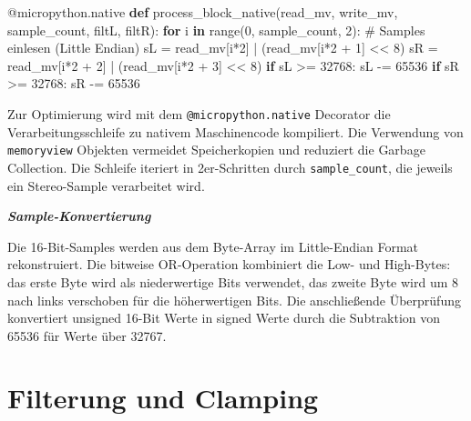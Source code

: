 \documentclass[
  ngerman,
  letterpaper,
  DIV=11]{scrreprt}
\newenvironment{Shaded}{\begin{snugshade}}{\end{snugshade}}
\newcommand{\AttributeTok}[1]{\textcolor[rgb]{0.40,0.45,0.13}{#1}}
\newcommand{\BuiltInTok}[1]{\textcolor[rgb]{0.00,0.23,0.31}{#1}}
\newcommand{\CommentTok}[1]{\textcolor[rgb]{0.37,0.37,0.37}{#1}}
\newcommand{\ControlFlowTok}[1]{\textcolor[rgb]{0.00,0.23,0.31}{\textbf{#1}}}
\newcommand{\DecValTok}[1]{\textcolor[rgb]{0.68,0.00,0.00}{#1}}
\newcommand{\KeywordTok}[1]{\textcolor[rgb]{0.00,0.23,0.31}{\textbf{#1}}}
\newcommand{\NormalTok}[1]{\textcolor[rgb]{0.00,0.23,0.31}{#1}}
\newcommand{\OperatorTok}[1]{\textcolor[rgb]{0.37,0.37,0.37}{#1}}
\begin{document}
\begin{Shaded}
\begin{Highlighting}[]
\AttributeTok{@micropython.native}
\KeywordTok{def}\NormalTok{ process\_block\_native(read\_mv, write\_mv, sample\_count, filtL, filtR):}
    \ControlFlowTok{for}\NormalTok{ i }\KeywordTok{in} \BuiltInTok{range}\NormalTok{(}\DecValTok{0}\NormalTok{, sample\_count, }\DecValTok{2}\NormalTok{):}
        \CommentTok{\# Samples einlesen (Little Endian)}
\NormalTok{        sL }\OperatorTok{=}\NormalTok{ read\_mv[i}\OperatorTok{*}\DecValTok{2}\NormalTok{] }\OperatorTok{|}\NormalTok{ (read\_mv[i}\OperatorTok{*}\DecValTok{2} \OperatorTok{+} \DecValTok{1}\NormalTok{] }\OperatorTok{\textless{}\textless{}} \DecValTok{8}\NormalTok{)}
\NormalTok{        sR }\OperatorTok{=}\NormalTok{ read\_mv[i}\OperatorTok{*}\DecValTok{2} \OperatorTok{+} \DecValTok{2}\NormalTok{] }\OperatorTok{|}\NormalTok{ (read\_mv[i}\OperatorTok{*}\DecValTok{2} \OperatorTok{+} \DecValTok{3}\NormalTok{] }\OperatorTok{\textless{}\textless{}} \DecValTok{8}\NormalTok{)}
        \ControlFlowTok{if}\NormalTok{ sL }\OperatorTok{\textgreater{}=} \DecValTok{32768}\NormalTok{:}
\NormalTok{            sL }\OperatorTok{{-}=} \DecValTok{65536}
        \ControlFlowTok{if}\NormalTok{ sR }\OperatorTok{\textgreater{}=} \DecValTok{32768}\NormalTok{:}
\NormalTok{            sR }\OperatorTok{{-}=} \DecValTok{65536}
\end{Highlighting}
\end{Shaded}

Zur Optimierung wird mit dem \texttt{@micropython.native} Decorator die
Verarbeitungsschleife zu nativem Maschinencode kompiliert. Die
Verwendung von \texttt{memoryview} Objekten vermeidet Speicherkopien und
reduziert die Garbage Collection. Die Schleife iteriert in 2er-Schritten
durch \texttt{sample\_count}, die jeweils ein Stereo-Sample verarbeitet
wird.

\textbf{\emph{Sample-Konvertierung}}

Die 16-Bit-Samples werden aus dem Byte-Array im Little-Endian Format
rekonstruiert. Die bitweise OR-Operation kombiniert die Low- und
High-Bytes: das erste Byte wird als niederwertige Bits verwendet, das
zweite Byte wird um 8 nach links verschoben für die höherwertigen Bits.
Die anschließende Überprüfung konvertiert unsigned 16-Bit Werte in
signed Werte durch die Subtraktion von 65536 für Werte über 32767.

\section{Filterung und Clamping}\label{filterung-und-clamping}
\end{document}

